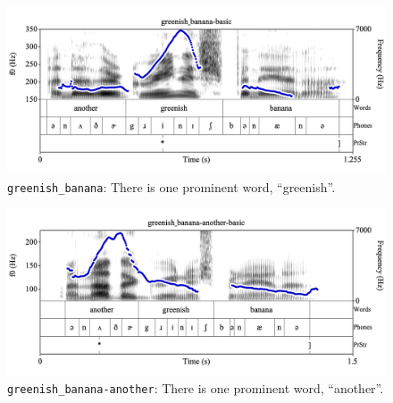 \documentclass[11pt, twoside]{memoir}
\begin{document}
\begin{figure}[H]
\centering
%
\includegraphics[width=.875\linewidth]{PrStr-greenish_banana-basic.png}
%
\caption{\texttt{greenish\_banana}: There is one prominent word, “greenish”.%
\label{fig:greenish banana prominent greenish}%
%
}
\end{figure}

\begin{figure}[H]
\centering
%
\includegraphics[width=.875\linewidth]{PrStr-greenish_banana-another-basic.png}
%
\caption{\texttt{greenish\_banana-another}: There is one prominent word, “another”.%
\label{fig:greenish banana prominent another}%
%
}
\end{figure}
\end{document}
